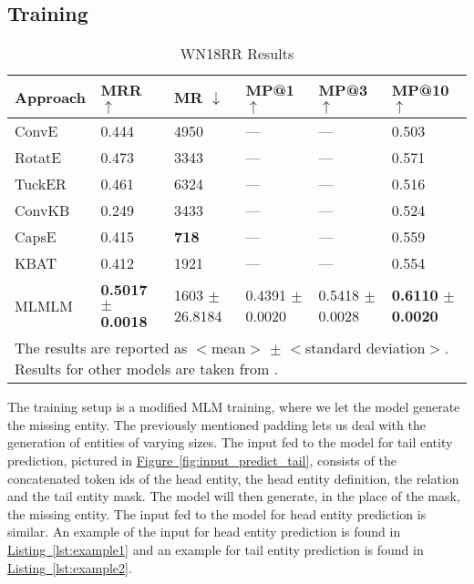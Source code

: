\documentclass[11pt,a4paper]{article}
\newcommand{\CiteT}[1]{\citet{#1}} \newcommand{\CiteP}[1]{~\citep{#1}} \newcommand{\CodeT}[1]{\texttt{#1}}
\newcommand{\RefFigure}[1]{\hyperref[#1]{Figure~\ref{#1}}}
\newcommand{\RefListing}[1]{\hyperref[#1]{Listing~\ref{#1}}}
\newcommand{\TableW}[3]{\begin{table*}[h!]
\begin{center}
  \caption{#3} 
  \vspace{-0.25\baselineskip}
  \label{#2}
  #1
\end{center}
\end{table*}}
\begin{document}
\subsection{Training}

\TableW{\begin{tabular}{m{}m{}m{0.1\textwidth}m{0.1\textwidth}m{0.1\textwidth}m{0.1\textwidth}}
    \toprule
    Approach & MRR $\uparrow$ & MR $\downarrow$ & MP@1 $\uparrow$ & MP@3 $\uparrow$ & MP@10 $\uparrow$\\
    \midrule
    ConvE & 0.444 & 4950 & --- & --- & 0.503\\
    RotatE & 0.473 & 3343 & --- & --- & 0.571\\
    TuckER & 0.461 & 6324 & --- & --- & 0.516\\
    \midrule
    ConvKB & 0.249 & 3433 & --- & --- & 0.524\\
    CapsE & 0.415 & \textbf{718} & --- & --- & 0.559\\
    KBAT & 0.412 & 1921 & --- & --- & 0.554\\
    \midrule
    MLMLM & 
        \shortstack[l]{\textbf{0.5017}\\\textbf{\small$\pm$ 0.0018}} &
        \shortstack[l]{1603\\{\small$\pm$ 26.8184}} &
        \shortstack[l]{{0.4391}\\{\small$\pm$ 0.0020}} &
        \shortstack[l]{{0.5418}\\{\small$\pm$ 0.0028}} &
        \shortstack[l]{\textbf{0.6110}\\\textbf{\small$\pm$ 0.0020}}\\
    \bottomrule
    \multicolumn{6}{p{.8\textwidth}}{\small The results are reported as $<$mean$>$ $\pm$ $<$standard deviation$>$. Results for other models are taken from \CiteT{ReevaluationKB}.}
  \end{tabular}}
{tab:results_WN18}
{WN18RR Results}





The training setup is a modified MLM training, where we let the model generate the missing entity.
The previously mentioned padding lets us deal with the generation of entities of varying sizes.
The input fed to the model for tail entity prediction, pictured in \RefFigure{fig:input_predict_tail}, consists of the concatenated token ids of the head entity, the head entity definition, the relation and the tail entity mask.
The model will then generate, in the place of the mask, the missing entity.
The input fed to the model for head entity prediction is similar.
An example of the input for head entity prediction is found in \RefListing{lst:example1} and an example for tail entity prediction is found in \RefListing{lst:example2}.
\end{document}
